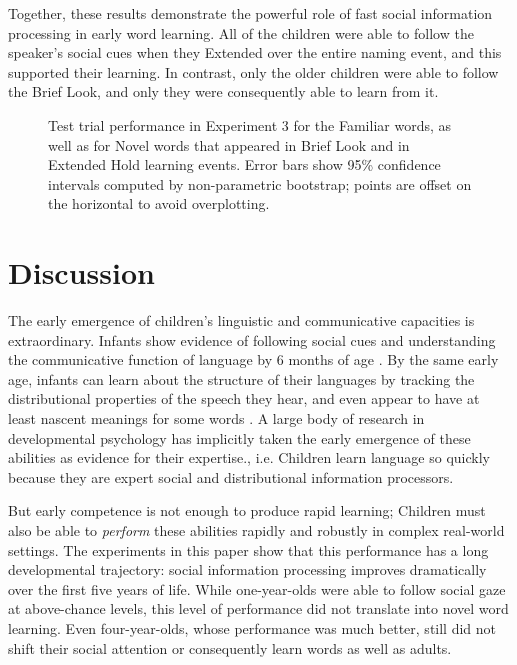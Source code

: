 \documentclass{pnastwo}
\begin{document}
\begin{article}
Together, these results demonstrate the powerful role of fast social information processing in early word learning. All of the children were able to follow the speaker's social cues when they Extended over the entire naming event, and this supported their learning. In contrast, only the older children were able to follow the Brief Look, and only they were consequently able to learn from it.


\begin{figure}[tb]
	\caption{Test trial performance in Experiment 3 for the Familiar words, as well as for Novel words that appeared in Brief Look and in Extended Hold learning events. Error bars show 95\% confidence intervals computed by non-parametric bootstrap; points are offset on the horizontal to avoid overplotting.}
	\label{fig:soc_word_test}
\end{figure}


\section{Discussion}

The early emergence of children's linguistic and communicative capacities is extraordinary. Infants show evidence of following social cues and understanding the communicative function of language by 6 months of age \citep{senju2008, vouloumanos2014}. By the same early age, infants can learn about the structure of their languages by tracking the distributional properties of the speech they hear, and even appear to have at least nascent meanings for some words \citep{thiessen2003, bergelson2012}. A large body of research in developmental psychology has implicitly taken the early emergence of these abilities as evidence for their expertise., i.e. Children learn language so quickly because they are expert social and distributional information processors.

But early competence is not enough to produce rapid learning; Children must also be able to \emph{perform} these abilities rapidly and robustly in complex real-world settings. The experiments in this paper show that this performance has a long developmental trajectory: social information processing improves dramatically over the first five years of life. While one-year-olds were able to follow social gaze at above-chance levels, this level of performance did not translate into novel word learning. Even four-year-olds, whose performance was much better, still did not shift their social attention or consequently learn words as well as adults.


\end{article}
\end{document}
